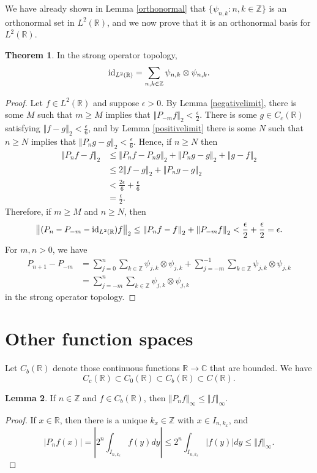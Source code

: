 \documentclass{article}
\newcommand{\id}{\ensuremath\mathrm{id}}
\newcommand{\norm}[1]{\left\Vert #1 \right\Vert}
\theoremstyle{definition}
\newtheorem{theorem}{Theorem}
\newtheorem{lemma}[theorem]{Lemma}
\theoremstyle{definition}
\begin{document}
We have already shown in Lemma \ref{orthonormal} that $\{\psi_{n,k}:n,k \in \mathbb{Z}\}$ is an orthonormal set in $L^2(\mathbb{R})$, and we now prove
that it  is an orthonormal basis for
$L^2(\mathbb{R})$. 

\begin{theorem}
In the strong operator topology,
\[
\id_{L^2(\mathbb{R})} = \sum_{n,k \in \mathbb{Z}} \psi_{n,k} \otimes \psi_{n,k}. 
\]
\end{theorem}
\begin{proof}
Let $f \in L^2(\mathbb{R})$ and suppose $\epsilon>0$. 
By Lemma \ref{negativelimit}, there is some $M$ such that $m \geq M$ implies that 
$\norm{P_{-m} f}_2 < \frac{\epsilon}{2}$.
There is some $g \in C_c(\mathbb{R})$ satisfying $\norm{f-g}_2 < \frac{\epsilon}{6}$, and 
 by Lemma \ref{positivelimit} there is some $N$ such that $n \geq N$ implies that $\norm{P_n g-g}_2<\frac{\epsilon}{6}$.
Hence, if $n \geq N$ then
\begin{align*}
\norm{P_nf-f}_2 &\leq \norm{P_nf-P_ng}_2+\norm{P_ng-g}_2+\norm{g-f}_2\\
&\leq2\norm{f-g}_2 + \norm{P_ng-g}_2\\
&<\frac{2\epsilon}{6}+\frac{\epsilon}{6}\\
&=\frac{\epsilon}{2}.
\end{align*}
Therefore, if $m \geq M$ and $n \geq N$, then
\[
\norm{(P_n-P_{-m}-\id_{L^2(\mathbb{R}})f}_2\leq  \norm{P_nf-f}_2 + \norm{P_{-m}f}_2 < \frac{\epsilon}{2}+\frac{\epsilon}{2} = \epsilon.
\]
For $m,n>0$, we have
\begin{align*}
P_{n+1}-P_{-m}&= \sum_{j=0}^n \sum_{k \in \mathbb{Z}} \psi_{j,k} \otimes \psi_{j,k} + \sum_{j=-m}^{-1} \sum_{k \in \mathbb{Z}}
\psi_{j,k} \otimes \psi_{j,k}\\
&=\sum_{j=-m}^n \sum_{k \in \mathbb{Z}} \psi_{j,k} \otimes \psi_{j,k}
\end{align*}
in the strong operator topology.
\end{proof}


\section{Other function spaces}
Let $C_b(\mathbb{R})$ denote those continuous functions $\mathbb{R} \to \mathbb{C}$ that are bounded. We
have
\[
C_c(\mathbb{R}) \subset C_0(\mathbb{R}) \subset C_b(\mathbb{R}) \subset C(\mathbb{R}).
\]

\begin{lemma}
If $n \in \mathbb{Z}$ and $f \in C_b(\mathbb{R})$, then $\norm{P_nf}_\infty \leq \norm{f}_\infty$.
\end{lemma}
\begin{proof}
If $x \in \mathbb{R}$, then
there is a unique $k_x \in \mathbb{Z}$ with $x \in I_{n,k_x}$, and
\[
|P_nf(x)| = \left| 2^n \int_{I_{n,k_x}} f(y) dy \right| \leq 2^n \int_{I_{n,k_x}} |f(y)| dy \leq
 \norm{f}_\infty.
\]
\end{proof}
\end{document}
